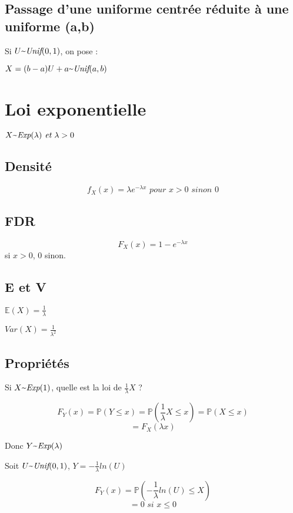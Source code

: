 \documentclass{article}
\newcommand{\textapprox}{\raisebox{0.5ex}{\texttildelow}}
\begin{document}
\subsection{Passage d'une uniforme centrée réduite à une uniforme (a,b)}
Si $U \textapprox \textit{Unif}(0,1)$, on pose :

$X = (b-a)U + a \textapprox \textit{Unif}(a,b)$

\section{Loi exponentielle}

$X \textapprox \textit{Exp}(\lambda) \textit{ et } \lambda > 0$

\subsection{Densité}
$$ f_X(x) = \lambda e^{-\lambda x} \textit{ pour } x > 0 \textit{ sinon } 0$$

\subsection{FDR}

$$ F_X(x) = 1 - e^{-\lambda x} $$ si $x > 0$, $0$ sinon.

\subsection{E et V}

$\mathbb{E}(X) = \frac{1}{\lambda}$

$\textit{Var}(X) = \frac{1}{\lambda^2}$

\subsection{Propriétés}

Si $X \textapprox \textit{Exp}(1)$, quelle est la loi de $\frac{1}{\lambda}X$ ?

$$ F_Y(x) = \mathbb{P}(Y \leq x) = \mathbb{P}(\frac{1}{\lambda} X \leq x) = \mathbb{P}(X \leq x) $$
$$ = F_X(\lambda x)$$

Donc $Y \textapprox \textit{Exp}(\lambda)$

Soit $U \textapprox \textit{Unif}(0,1)$,
$ Y = - \frac{1}{\lambda} ln(U)$

$$ F_Y(x) = \mathbb{P}(- \frac{1}{\lambda}ln(U) \leq X)$$
$$ = 0 \textit{ si } x \leq 0 $$
\end{document}
